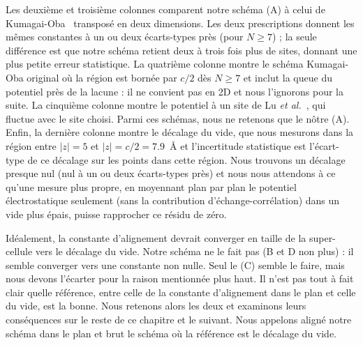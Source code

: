 \begin{table}[htbp]
    \centering\small
    \caption[Constantes d'alignement selon quatre schémas et décalage du vide.]{Constantes d'alignement dans le plan du potentiel de la lacune selon quatre prescriptions et décalage du vide. La constante d'alignement est la moyenne des potentiels (sphères de $1$~\AA) sur (A) les sites à $d\geq0.75\,r_\text{max}$ (notre schéma), (B) les sites hors du cercle inscrit dans la cellule de Wigner-Seitz autour de la lacune de rayon $N a/2$ (Kumagai-Oba 2D), (C) les sites hors de la sphère inscrite dans la cellule de Wigner-Seitz de rayon $\min(Na/2, c/2)$ (Kumagai-Oba 3D) et (D) le site unique le plus éloigné de la lacune (Lu \textit{et al.}~\cite{luEfficientInitioCalculations2019}). L'écart-type des sites donne l'incertitude. (E) Décalage du vide : moyenne et écart-type pour $5\leq|z|\leq c/2=7.9$~\AA. Toutes les valeurs en meV.}
    \label{tab:alignement}
    
\end{table}

Les deuxième et troisième colonnes comparent notre schéma (A) à celui de Kumagai-Oba~\cite{kumagaiElectrostaticsbasedFinitesizeCorrections2014} transposé en deux dimensions. Les deux prescriptions donnent les mêmes constantes à un ou deux écarts-types près (pour $N\geq 7$) ; la seule différence est que notre schéma retient deux à trois fois plus de sites, donnant une plus petite erreur statistique. La quatrième colonne montre le schéma Kumagai-Oba original où la région est bornée par $c/2$ dès $N\geq 7$ et inclut la queue du potentiel près de la lacune : il ne convient pas en 2D et nous l'ignorons pour la suite. La cinquième colonne montre le potentiel à un site de Lu \textit{et al.}~\cite{luEfficientInitioCalculations2019}, qui fluctue avec le site choisi. Parmi ces schémas, nous ne retenons que le nôtre (A). Enfin, la dernière colonne montre le décalage du vide, que nous mesurons dans la région entre $|z|=5$ et $|z|=c/2=7.9$~\AA{} et l'incertitude statistique est l'écart-type de ce décalage sur les points dans cette région. Nous trouvons un décalage presque nul (nul à un ou deux écarts-types près) et nous nous attendons à ce qu'une mesure plus propre, en moyennant plan par plan le potentiel électrostatique seulement (sans la contribution d'échange-corrélation) dans un vide plus épais, puisse rapprocher ce résidu de zéro.

Idéalement, la constante d'alignement devrait converger en taille de la super-cellule vers le décalage du vide. Notre schéma ne le fait pas (B et D non plus) : il semble converger vers une constante non nulle. Seul le (C) semble le faire, mais nous devons l'écarter pour la raison mentionnée plus haut. Il n'est pas tout à fait clair quelle référence, entre celle de la constante d'alignement dans le plan et celle du vide, est la bonne. Nous retenons alors les deux et examinons leurs conséquences sur le reste de ce chapitre et le suivant. Nous appelons \og aligné \fg{} notre schéma dans le plan et \og brut \fg{} le schéma où la référence est le décalage du vide.


